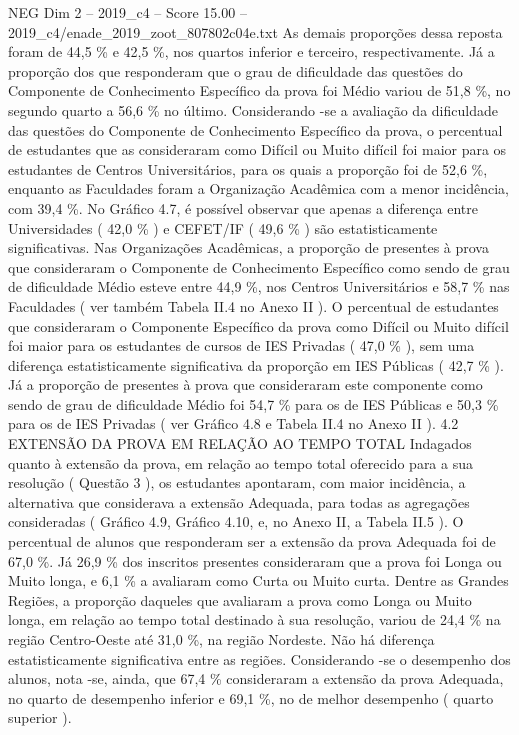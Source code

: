 \begin{textsample}{NEG Dim 2 – 2019\_c4 – Score 15.00 – 2019\_c4/enade\_2019\_zoot\_807802c04e.txt}
As demais proporções dessa reposta foram de 44,5 \% e 42,5 \%, nos quartos inferior e terceiro, respectivamente.
Já a proporção dos que responderam que o grau de dificuldade das questões do Componente de Conhecimento Específico da prova foi Médio variou de 51,8 \%, no segundo quarto a 56,6 \% no último.
Considerando -se a avaliação da dificuldade das questões do Componente de Conhecimento Específico da prova, o percentual de estudantes que as consideraram como Difícil ou Muito difícil foi maior para os estudantes de Centros Universitários, para os quais a proporção foi de 52,6 \%, enquanto as Faculdades foram a Organização Acadêmica com a menor incidência, com 39,4 \%.
No Gráfico 4.7, é possível observar que apenas a diferença entre Universidades ( 42,0 \% ) e CEFET/IF ( 49,6 \% ) são estatisticamente significativas.
Nas Organizações Acadêmicas, a proporção de presentes à prova que consideraram o Componente de Conhecimento Específico como sendo de grau de dificuldade Médio esteve entre 44,9 \%, nos Centros Universitários e 58,7 \% nas Faculdades ( ver também Tabela II.4 no Anexo II ).
O percentual de estudantes que consideraram o Componente Específico da prova como Difícil ou Muito difícil foi maior para os estudantes de cursos de IES Privadas ( 47,0 \% ), sem uma diferença estatisticamente significativa da proporção em IES Públicas ( 42,7 \% ).
Já a proporção de presentes à prova que consideraram este componente como sendo de grau de dificuldade Médio foi 54,7 \% para os de IES Públicas e 50,3 \% para os de IES Privadas ( ver Gráfico 4.8 e Tabela II.4 no Anexo II ). 4.2 EXTENSÃO DA PROVA EM RELAÇÃO AO TEMPO TOTAL Indagados quanto à extensão da prova, em relação ao tempo total oferecido para a sua resolução ( Questão 3 ), os estudantes apontaram, com maior incidência, a alternativa que considerava a extensão Adequada, para todas as agregações consideradas ( Gráfico 4.9, Gráfico 4.10, e, no Anexo II, a Tabela II.5 ).
O percentual de alunos que responderam ser a extensão da prova Adequada foi de 67,0 \%.
Já 26,9 \% dos inscritos presentes consideraram que a prova foi Longa ou Muito longa, e 6,1 \% a avaliaram como Curta ou Muito curta.
Dentre as Grandes Regiões, a proporção daqueles que avaliaram a prova como Longa ou Muito longa, em relação ao tempo total destinado à sua resolução, variou de 24,4 \% na região Centro-Oeste até 31,0 \%, na região Nordeste.
Não há diferença estatisticamente significativa entre as regiões.
Considerando -se o desempenho dos alunos, nota -se, ainda, que 67,4 \% consideraram a extensão da prova Adequada, no quarto de desempenho inferior e 69,1 \%, no de melhor desempenho ( quarto superior ).

\end{textsample}
